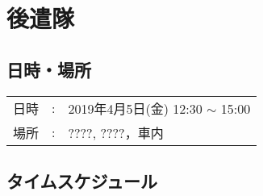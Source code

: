 %

\section{後遣隊}

\subsection{日時・場所}

\begin{tabular}{p{}rp{}}
  日時 & : & 2019年4月5日(金) 12:30 $\sim$ 15:00\\
  場所 & : & ????, ????，車内
\end{tabular}

\subsection{タイムスケジュール}


